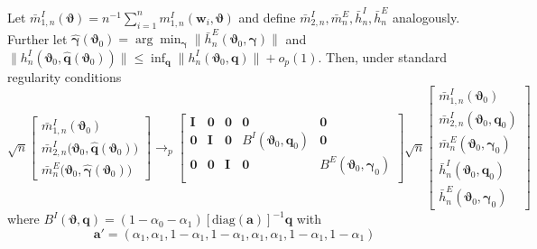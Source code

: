 \begin{lem}
  Let $\bar{m}^I_{1,n}(\boldsymbol{\vartheta}) = n^{-1}\sum_{i=1}^n m_{1,n}^I(\mathbf{w}_i,\boldsymbol{\vartheta})$ and define $\bar{m}_{2,n}^I, \bar{m}_n^E, \bar{h}_n^I,\bar{h}_n^E$ analogously.
  Further let $\widehat{\boldsymbol{\gamma}}(\boldsymbol{\vartheta}_0) = \arg \min_{\boldsymbol{\gamma}} \lVert \bar{h}_n^E(\boldsymbol{\vartheta}_0, \boldsymbol{\gamma}) \rVert$ and 
    $\lVert h_n^I(\boldsymbol{\vartheta}_0, \widehat{\mathbf{q}}(\boldsymbol{\vartheta}_0))\rVert \leq \inf_{\mathbf{q}} \lVert h_n^I(\boldsymbol{\vartheta}_0, \mathbf{q})\rVert + o_p(1)$.
Then, under standard regularity conditions
  \[
    \sqrt{n}\left[
    \begin{array}{l}
      \bar{m}_{1,n}^I\left( \boldsymbol{\vartheta}_0 \right)\\
      \bar{m}_{2,n}^I\big( \boldsymbol{\vartheta}_0, \widehat{\mathbf{q}}(\boldsymbol{\vartheta}_0)\big)\\
      \bar{m}_{n}^E\big( \boldsymbol{\vartheta}_0, \widehat{\boldsymbol{\gamma}}(\boldsymbol{\vartheta}_0) \big)
    \end{array}
  \right] \rightarrow_p 
  \left[
  \begin{array}{ccccc}
    \mathbf{I}&\mathbf{0}&\mathbf{0} & \mathbf{0} & \mathbf{0} \\
    \mathbf{0}&\mathbf{I}&\mathbf{0} & B^I( \boldsymbol{\vartheta}_0, \boldsymbol{q}_0)& \mathbf{0} \\
    \mathbf{0}&\mathbf{0}&\mathbf{I} &\mathbf{0} & B^E(\boldsymbol{\vartheta}_0,\boldsymbol{\gamma}_0)\\
  \end{array}
\right] 
    \sqrt{n}\left[
    \begin{array}{l}
      \bar{m}_{1,n}^I\left( \boldsymbol{\vartheta}_0 \right)\\
      \bar{m}_{2,n}^I\left(\boldsymbol{\vartheta}_0,  \mathbf{q}_0\right)\\
      \bar{m}_n^E\left(\boldsymbol{\vartheta}_0, \boldsymbol{\gamma}_0  \right)\\
      \bar{h}^I_n\left(\boldsymbol{\vartheta}_0,  \mathbf{q}_0 \right)\\
      \bar{h}^E_n\left(\boldsymbol{\vartheta}_0,  \boldsymbol{\gamma}_0 \right)
    \end{array}
  \right] 
  \]
  where $B^I( \boldsymbol{\vartheta}, \boldsymbol{q}) = (1 - \alpha_0 - \alpha_1) \left[\mbox{diag}(\mathbf{a})  \right]^{-1} \mathbf{q}$ 
  with 
  \[
  \mathbf{a}' = (\alpha_1, \alpha_1, 1 - \alpha_1, 1 - \alpha_1, \alpha_1, \alpha_1, 1 - \alpha_1, 1 - \alpha_1)
\]
\end{lem}
